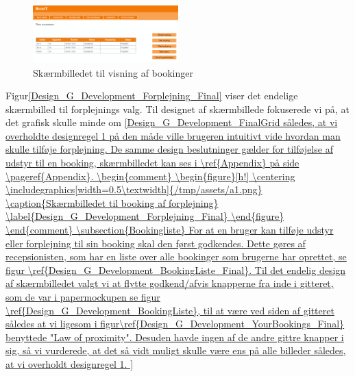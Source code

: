 \begin{figure}[h!]
  \centering
    \includegraphics[width=0.5\textwidth]{Appendix/GUI-Prototype/DigitalMockup/DineBookinger}
  \caption{Skærmbilledet til visning af bookinger}
\label{Design_G_Development_YourBookings_Final}
\end{figure} 

Figur\ref{Design_G_Development_Forplejning_Final} viser det endelige skærmbilled til forplejnings valg. Til designet af skærmbillede fokuserede vi på, at det grafisk skulle minde om \ref{Design_G_Development_FinalGrid således, at vi overholdte designregel 1 på den måde ville brugeren intuitivt vide hvordan man skulle tilføje forplejning. De samme design beslutninger gælder for tilføjelse af udstyr til en booking, skærmbilledet kan ses i  \ref{Appendix} på side \pageref{Appendix}.

\subsection{Bookingliste}
For at en bruger kan tilføje udstyr eller forplejning til sin booking skal den først godkendes. Dette gøres af recepsionisten, som har en liste over alle bookinger som brugerne har oprettet, se figur \ref{Design_G_Development_BookingListe_Final}. Til det endelig design af skærmbilledet valgt vi at flytte godkend/afvis knapperne fra inde i gitteret, som de var i papermockupen se figur \ref{Design_G_Development_BookingListe}, til at være ved siden af gitteret således at vi ligesom i figur\ref{Design_G_Development_YourBookings_Final} benyttede "Law of proximity". Desuden havde ingen af de andre gittre knapper i sig, så vi vurderede, at det så vidt muligt skulle være ens på alle billeder således, at vi overholdt designregel 1.

}
